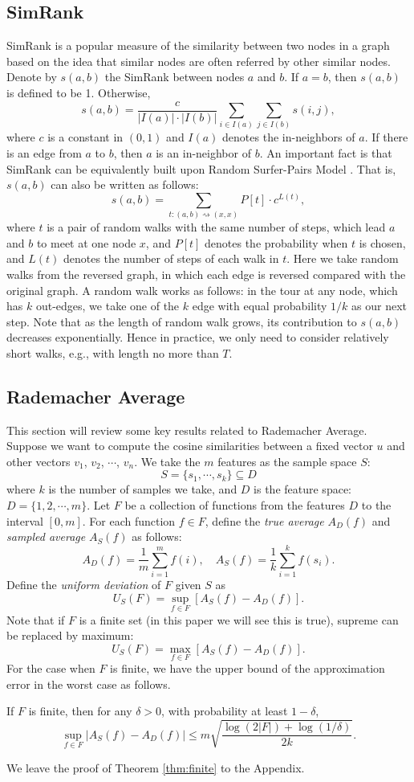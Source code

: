\documentclass{article}
\begin{document}
\subsection{SimRank}
SimRank \cite{JW02} is a popular measure of the similarity between two nodes in a graph based on the idea that similar nodes are often referred by other similar nodes. Denote by $s(a,b)$ the SimRank between nodes $a$ and $b$. If $a=b$, then $s(a,b)$ is defined to be 1. Otherwise, 
$$s(a,b) = \frac{c}{|I(a)|\cdot|I(b)|}\sum_{i\in I(a)}\sum_{j\in I(b)}s(i,j),$$
where $c$ is a constant in $(0,1)$ and $I(a)$ denotes the in-neighbors of $a$. If there is an edge from $a$ to $b$, then $a$ is an in-neighbor of $b$. 
An important fact is that SimRank can be equivalently built upon Random Surfer-Pairs Model \cite{JW02}. That is, $s(a,b)$ can also be written as follows:
$$s(a,b) = \sum_{t: (a,b) \rightsquigarrow (x,x)} P[t]\cdot c^{L(t)},$$
where $t$ is a pair of random walks with the same number of steps, which lead $a$ and $b$ to meet at one node $x$, and $P[t]$ denotes the probability when $t$ is chosen, and $L(t)$ denotes the number of steps of each walk in $t$. Here we take random walks from the reversed graph, in which each edge is reversed compared with the original graph. A random walk works as follows: in the tour at any node, which has $k$ out-edges, we take one of the $k$ edge with equal probability $1/k$ as our next step. Note that as the length of random walk grows, its contribution to $s(a,b)$ decreases exponentially. Hence in practice, we only need to consider relatively short walks, e.g., with length no more than $T$.

\subsection{Rademacher Average}
This section will review some key results related to Rademacher Average. 
Suppose we want to compute the cosine similarities between a fixed vector $u$ and other vectors $v_1$, $v_2$, $\cdots$, $v_n$. We take the $m$ features as the sample space $S$:
$$S = \{s_1, \cdots, s_k\} \subseteq D$$
where $k$ is the number of samples we take, and $D$ is the feature space: $D = \{1,2,\cdots,m\}$.
Let $F$ be a collection of functions from the features $D$ to the interval $[0, m]$.
For each function $f\in F$, define the \emph{true average} $A_D(f)$ and \emph{sampled average} $A_S(f)$ as follows:
$$A_D(f) = \frac{1}{m} \sum_{i=1}^m f(i),\quad A_S(f) = \frac{1}{k} \sum_{i=1}^k f(s_i).$$
Define the \emph{uniform deviation} \cite{Oneto13} of $F$ given $S$ as
$$U_S(F) = \sup_{f\in F} [ A_S(f) - A_D(f) ].$$
Note that if $F$ is a finite set (in this paper we will see this is true), supreme can be replaced by maximum:
$$U_S(F) = \max_{f\in F} [ A_S(f) - A_D(f) ].$$
For the case when $F$ is finite, we have the upper bound of the approximation error in the worst case as follows.
\begin{theorem}
\label{thm:finite}
If $F$ is finite, then for any $\delta > 0$, with probability at least $1-\delta$,
$$\sup_{f\in F} | A_S(f) - A_D(f) | \leq m\sqrt{\frac{\log(2|F|) + \log(1/\delta)}{2k}}.$$ 
\end{theorem}
We leave the proof of Theorem \ref{thm:finite} to the Appendix.
\end{document}
